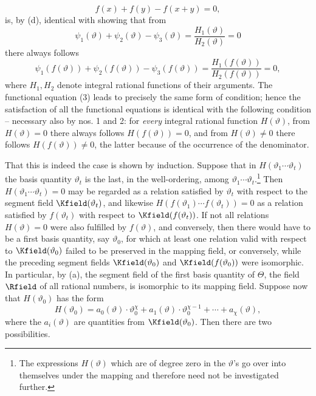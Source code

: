 \[
f(x)+f(y)-f(x+y)=0,
\]
is, by (d), identical with showing that from
\[
\psi_1(\vartheta)+\psi_2(\vartheta)-\psi_3(\vartheta)
 =\frac{H_1(\vartheta)}{H_2(\vartheta)}=0
\]
there always follows
\[
\psi_1(f(\vartheta))+\psi_2(f(\vartheta))-\psi_3(f(\vartheta))
 =\frac{H_1(f(\vartheta))}{H_2(f(\vartheta))}=0,
\]
where \(H_1,H_2\) denote integral rational functions of their arguments. The functional equation (3) leads to precisely the same form of condition; hence the satisfaction of all the functional equations is identical with the following condition -- necessary also by nos. 1 and 2: for \emph{every} integral rational function \(H(\vartheta)\), from \(H(\vartheta)=0\) there always follows \(H(f(\vartheta))=0\), and from \(H(\vartheta)\ne0\) there follows \(H(f(\vartheta))\ne0\), the latter because of the occurrence of the denominator.

That this is indeed the case is shown by induction. Suppose that in \(H(\vartheta_1\cdots\vartheta_t)\) the basis quantity \(\vartheta_t\) is the last, in the well-ordering, among \(\vartheta_1\cdots\vartheta_t\).\footnote{The expressions \(H(\vartheta)\) which are of degree zero in the \(\vartheta\)'s go over into themselves under the mapping and therefore need not be investigated further.} Then \(H(\vartheta_1\cdots\vartheta_t)=0\) may be regarded as a relation satisfied by \(\vartheta_t\) with respect to the segment field \(\Kfield(\vartheta_t)\), and likewise \(H(f(\vartheta_1)\cdots f(\vartheta_t))=0\) as a relation satisfied by \(f(\vartheta_t)\) with respect to \(\Kfield(f(\vartheta_t))\). If not all relations \(H(\vartheta)=0\) were also fulfilled by \(f(\vartheta)\), and conversely, then there would have to be a first basis quantity, say \(\vartheta_0\), for which at least one relation valid with respect to \(\Kfield(\vartheta_0)\) failed to be preserved in the mapping field, or conversely, while the preceding segment fields \(\Kfield(\vartheta_0)\) and \(\Kfield(f(\vartheta_0))\) were isomorphic. In particular, by (a), the segment field of the first basis quantity of \(\Theta\), the field \(\Rfield\) of all rational numbers, is isomorphic to its mapping field. Suppose now that \(H(\vartheta_0)\) has the form
\[
H(\vartheta_0)=a_0(\vartheta)\cdot\vartheta_0^\chi
+a_1(\vartheta)\cdot\vartheta_0^{\chi-1}+\cdots+a_\chi(\vartheta),
\]
where the \(a_i(\vartheta)\) are quantities from \(\Kfield(\vartheta_0)\). Then there are two possibilities.

